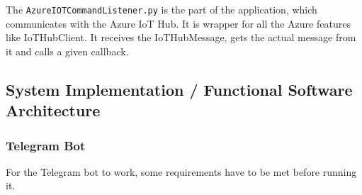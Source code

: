 \documentclass[a4paper]{article}
\begin{document}
				The \texttt{AzureIOTCommandListener.py} is the part of the application, which communicates with the Azure IoT Hub. It is wrapper for all the Azure features like IoTHubClient. It receives the IoTHubMessage, gets the actual message from it and calls a given callback.
		
		\newpage
		
		\subsection{System Implementation / Functional Software Architecture}
		
			\subsubsection{Telegram Bot}
			
			For the Telegram bot to work, some requirements have to be met before running it.\\
			
\end{document}
